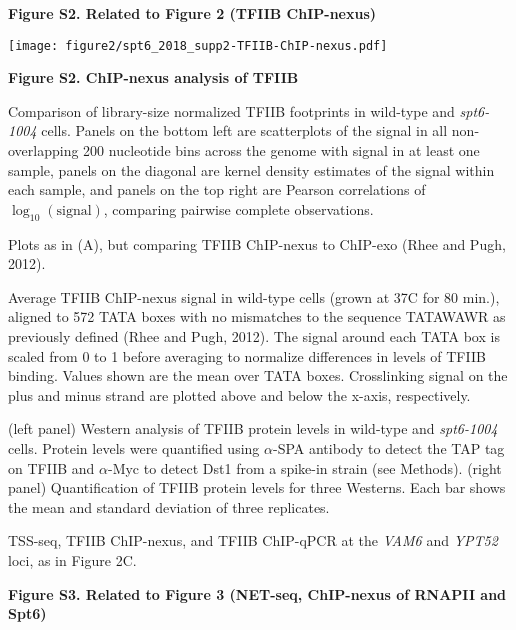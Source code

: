 \documentclass[9pt, letterpaper]{extarticle}
\begin{document}
\newpage

\textbf{\large Figure S2. Related to Figure 2 (TFIIB ChIP-nexus)}

{\centering \texttt{[image: figure2/spt6\_2018\_supp2-TFIIB-ChIP-nexus.pdf]}\par}

\textbf{Figure S2. ChIP-nexus analysis of TFIIB}

\begin{description}[noitemsep, topsep=0pt, align=right, labelwidth=12pt, itemindent=0pt, leftmargin=0pt]
	\item [\textbf{(A)}] Comparison of library-size normalized TFIIB footprints in wild-type and \textit{spt6-1004} cells. Panels on the bottom left are scatterplots of the signal in all non-overlapping 200 nucleotide bins across the genome with signal in at least one sample, panels on the diagonal are kernel density estimates of the signal within each sample, and panels on the top right are Pearson correlations of $\log_{10}\left(\text{signal} \right)$, comparing pairwise complete observations.
	\item [\textbf{(B)}] Plots as in (A), but comparing TFIIB ChIP-nexus to ChIP-exo (Rhee and Pugh, 2012).
	\item [\textbf{(C)}] Average TFIIB ChIP-nexus signal in wild-type cells (grown at 37{\textdegree}C for 80 min.), aligned to 572 TATA boxes with no mismatches to the sequence TATAWAWR as previously defined (Rhee and Pugh, 2012). The signal around each TATA box is scaled from 0 to 1 before averaging to normalize differences in levels of TFIIB binding. Values shown are the mean over TATA boxes. Crosslinking signal on the plus and minus strand are plotted above and below the x-axis, respectively.
	\item [\textbf{(D)}] (left panel) Western analysis of TFIIB protein levels in wild-type and \textit{spt6-1004} cells. Protein levels were quantified using $\alpha$-SPA antibody to detect the TAP tag on TFIIB and $\alpha$-Myc to detect Dst1 from a spike-in strain (see Methods). (right panel) Quantification of TFIIB protein levels for three Westerns. Each bar shows the mean and standard deviation of three replicates.
    \item [\textbf{(E)}] TSS-seq, TFIIB ChIP-nexus, and TFIIB ChIP-qPCR at the \textit{VAM6} and \textit{YPT52} loci, as in Figure 2C.
\end{description}

\newpage

\textbf{\large Figure S3. Related to Figure 3 (NET-seq, ChIP-nexus of RNAPII and Spt6)}
\end{document}
